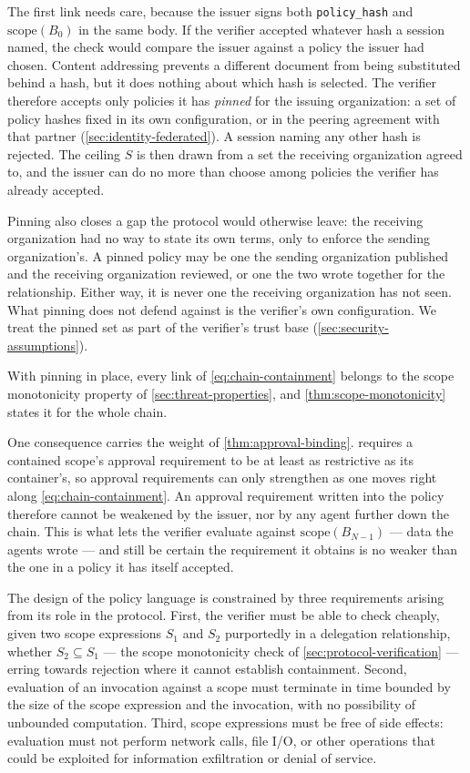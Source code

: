 \documentclass[11pt,a4paper]{article}
\begin{document}
The first link needs care, because the issuer signs both
\texttt{policy\_hash} and $\mathrm{scope}(B_0)$ in the same body. If the
verifier accepted whatever hash a session named, the check would compare
the issuer against a policy the issuer had chosen. Content addressing
prevents a different document from being substituted behind a hash, but
it does nothing about which hash is selected. The verifier therefore
accepts only policies it has \emph{pinned} for the issuing organization:
a set of policy hashes fixed in its own configuration, or in the peering
agreement with that partner (\cref{sec:identity-federated}). A session
naming any other hash is rejected. The ceiling $S$ is then drawn from a
set the receiving organization agreed to, and the issuer can do no more
than choose among policies the verifier has already accepted.

Pinning also closes a gap the protocol would otherwise leave: the
receiving organization had no way to state its own terms, only to
enforce the sending organization's. A pinned policy may be one the
sending organization published and the receiving organization reviewed,
or one the two wrote together for the relationship. Either way, it is
never one the receiving organization has not seen. What pinning does not
defend against is the verifier's own configuration. We treat the pinned
set as part of the verifier's trust base (\cref{sec:security-assumptions}).

With pinning in place, every link of \cref{eq:chain-containment} belongs
to the scope monotonicity property of \cref{sec:threat-properties}, and
\cref{thm:scope-monotonicity} states it for the whole chain.

One consequence carries the weight of \cref{thm:approval-binding}.
 requires a contained scope's approval requirement to
be at least as restrictive as its container's, so approval requirements
can only strengthen as one moves right along
\cref{eq:chain-containment}. An approval requirement written into the
policy therefore cannot be weakened by the issuer, nor by any agent
further down the chain. This is what lets the verifier evaluate against
$\mathrm{scope}(B_{N-1})$ --- data the agents wrote --- and still be
certain the requirement it obtains is no weaker than the one in a
policy it has itself accepted.

The design of the policy language is constrained by three requirements
arising from its role in the protocol. First, the verifier must be able
to check cheaply, given two scope expressions $S_1$ and $S_2$
purportedly in a delegation relationship, whether $S_2 \subseteq S_1$ ---
the scope monotonicity check of \cref{sec:protocol-verification} ---
erring towards rejection where it cannot establish containment. Second,
evaluation of an invocation against a scope must terminate in time
bounded by the size of the scope expression and the invocation, with
no possibility of unbounded computation. Third, scope expressions must
be free of side effects: evaluation must not perform network calls,
file I/O, or other operations that could be exploited for information
exfiltration or denial of service.
\end{document}
